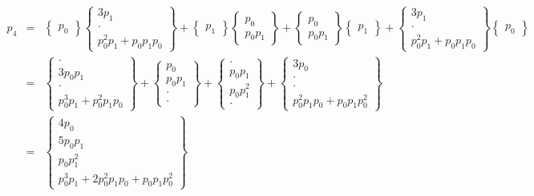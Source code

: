 \documentclass[a4paper,12pt]{article}
\numberwithin{definition}{section}
\numberwithin{lemma}{section}
\numberwithin{proposition}{section}
\numberwithin{theorem}{section}
\numberwithin{grammar}{section}
\numberwithin{program}{section}
\numberwithin{convention}{section}
\numberwithin{corollary}{section}
\numberwithin{principle}{section}
\begin{document}
$$\begin{array}{lcl}
p_4 & = & \begin{Bmatrix} p_0 \end{Bmatrix} \begin{Bmatrix} 3 p_1 \\ \cdot \\ p_0^2 p_1 + p_0 p_1 p_0  \end{Bmatrix} +
          \begin{Bmatrix} p_1 \end{Bmatrix} \begin{Bmatrix}  p_0 \\  p_0 p_1 \end{Bmatrix} +
          \begin{Bmatrix}  p_0 \\  p_0 p_1 \end{Bmatrix} \begin{Bmatrix} p_1 \end{Bmatrix} +
          \begin{Bmatrix} 3 p_1 \\ \cdot \\ p_0^2 p_1 + p_0 p_1 p_0 \end{Bmatrix}\begin{Bmatrix} p_0 \end{Bmatrix}\\
    & = & \begin{Bmatrix} \cdot \\ 3 p_0 p_1 \\ \cdot \\ p_0^3 p_1 + p_0^2 p_1 p_0 \end{Bmatrix} +
          \begin{Bmatrix} p_0 \\  p_0 p_1 \\ \cdot \\ \cdot \end{Bmatrix} +
          \begin{Bmatrix} \cdot \\ p_0 p_1 \\  p_0 p_1^2 \\ \cdot \end{Bmatrix} +
          \begin{Bmatrix} 3 p_0 \\ \cdot \\ \cdot \\ p_0^2 p_1 p_0 + p_0 p_1 p_0^2 \end{Bmatrix} \\
    & = & \begin{Bmatrix} 4 p_0 \\ 5 p_0 p_1 \\ p_0 p_1^2 \\ p_0^3 p_1 + 2 p_0^2 p_1 p_0 + p_0 p_1 p_0^2 \end{Bmatrix}
\end{array}
$$
\end{document}
